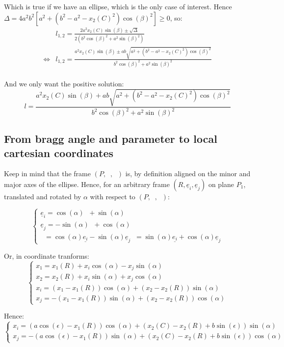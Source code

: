 \documentclass[a4paper,11pt,twoside,titlepage,openright]{book}
\numberwithin{equation}{section}
\newcommand{\ud}[1]{\underline{#1}}
\newcommand{\lt}{\left}
\newcommand{\rt}{\right}
\DeclareMathOperator{\ei}{\underline{e}_1}
\DeclareMathOperator{\et}{\underline{e}_2}
\begin{document}
Which is true if we have an ellipse, which is the only case of interest.
Hence $\Delta=4a^2b^2\lt[a^2 + \lt(b^2-a^2-x_2(C)^2\rt)\cos(\beta)^2\rt] \geq 0$, so:
$$
\begin{array}{lll}
	& l_{1,2} = \frac{2a^2x_2(C)\sin(\beta) \pm \sqrt{\Delta}}{2\lt(b^2\cos(\beta)^2 + a^2\sin(\beta)^2\rt)}\\
	\Leftrightarrow
	& l_{1,2} = \frac{a^2x_2(C)\sin(\beta) \pm ab\sqrt{a^2 + \lt(b^2-a^2-x_2(C)^2\rt)\cos(\beta)^2}}{b^2\cos(\beta)^2 + a^2\sin(\beta)^2}\\
\end{array}
$$

And we only want the positive solution:
$$
l = \frac{a^2x_2(C)\sin(\beta) + ab\sqrt{a^2 + \lt(b^2-a^2-x_2(C)^2\rt)\cos(\beta)^2}}{b^2\cos(\beta)^2 + a^2\sin(\beta)^2}
$$




\subsection{From bragg angle and parameter to local cartesian coordinates}

Keep in mind that the frame $(P, \ei, \et)$ is, by definition aligned on the minor and major axes of the ellipse.
Hence, for an arbitrary frame $(R, \ud{e}_i, \ud{e}_j)$ on plane $P_1$, translated and rotated by $\alpha$ with respect to $(P, \ei, \et)$:

$$
\lt\{
	\begin{array}{lll}
		\ud{e}_i = \cos(\alpha)\ei + \sin(\alpha)\et\\
		\ud{e}_j = -\sin(\alpha)\ei + \cos(\alpha)\et\\
		\ei = \cos(\alpha)\ud{e_i} - \sin(\alpha)\ud{e}_j
		\et = \sin(\alpha)\ud{e_i} + \cos(\alpha)\ud{e}_j
	\end{array}
\rt.
$$

Or, in coordinate tranforms:
$$
\lt\{
	\begin{array}{lll}
		x_1 = x_1(R) + x_i\cos(\alpha) - x_j\sin(\alpha)\\
		x_2 = x_2(R) + x_i\sin(\alpha) + x_j\cos(\alpha)\\
		x_i = (x_1-x_1(R))\cos(\alpha) + (x_2-x_2(R))\sin(\alpha)\\
		x_j = -(x_1-x_1(R))\sin(\alpha) + (x_2-x_2(R))\cos(\alpha)
	\end{array}
\rt.
$$

Hence:
$$
\lt\{
	\begin{array}{lll}
		x_i = \lt(a\cos(\epsilon)-x_1(R)\rt)\cos(\alpha) + \lt(x_2(C)-x_2(R) + b\sin(\epsilon)\rt)\sin(\alpha)\\
		x_j = -\lt(a\cos(\epsilon)-x_1(R)\rt)\sin(\alpha) + \lt(x_2(C)-x_2(R) + b\sin(\epsilon)\rt)\cos(\alpha)
	\end{array}
\rt.
$$
\end{document}
